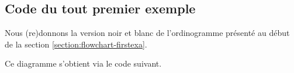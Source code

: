 \documentclass[12pt,a4paper]{article}
\begin{document}

\subsection{Code du tout premier exemple} \label{section:flowchart-firstexa-code}

Nous (re)donnons la version noir et blanc de l'ordinogramme présenté au début de la section \ref{section:flowchart-firstexa}.

\acusebw
\begin{center}
    \small
    
\end{center}
\acusecolor

Ce diagramme s'obtient via le code suivant.

\end{document}
